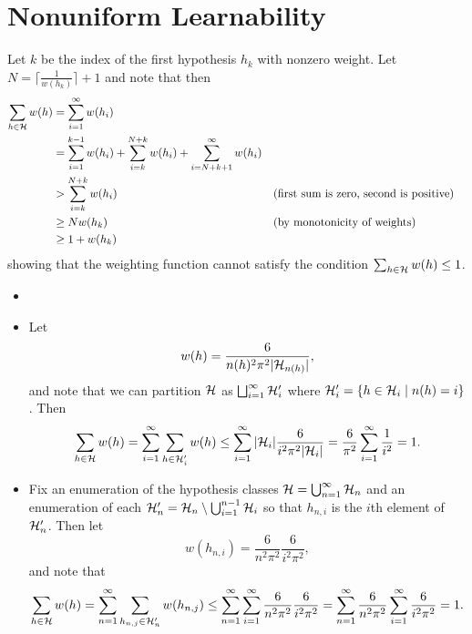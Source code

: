 \chapter{Nonuniform Learnability}

\begin{ex}
\end{ex}

\begin{ex}
  Let $k$ be the index of the first hypothesis $h_k$ with nonzero weight. Let
  $N=\lceil \frac{1}{w(h_k)} \rceil +1$ and note that then
  \begin{align*}
    \sum_{h\in\mathcal{H}} w(h)
     & =\sum_{i=1}^\infty w(h_i)                                                                             \\
     & =\sum_{i=1}^{k-1} w(h_i) +\sum_{i=k}^{N+k} w(h_i)
    +\sum_{i=N+k+1}^\infty w(h_i)                                                                            \\
     & > \sum_{i=k}^{N+k} w(h_i)                         &  & \text{(first sum is zero, second is positive)} \\
     & \geq N w(h_k)                                     &  & \text{(by monotonicity of weights)}            \\
     & \geq 1 + w(h_k)
  \end{align*}
  showing that the weighting function cannot satisfy the condition
  $\sum_{h\in\mathcal{H}}w(h)\leq 1$.
\end{ex}

\begin{ex}
  \begin{itemize}
    \item[]
    \item Let
          \[
            w(h)=\frac{6}{n(h)^2\pi^2|\mathcal{H}_{n(h)}|},
          \]
          and note that we can partition $\mathcal{H}$ as
          $\bigsqcup_{i=1}^\infty \mathcal{H}'_i$
          where $\mathcal{H}'_i=\{h\in \mathcal{H}_i \mid n(h) = i\}$. Then
          \begin{align*}
            \sum_{h\in\mathcal{H}} w(h)
            = \sum_{i=1}^\infty\sum_{h\in \mathcal{H}'_i} w(h)
            \leq \sum_{i=1}^\infty |\mathcal{H}_i| \frac{6}{i^2 \pi^2 |\mathcal{H}_i|}
            =\frac{6}{\pi^2}\sum_{i=1}^\infty \frac{1}{i^2} = 1.
          \end{align*}
    \item Fix an enumeration of the hypothesis classes
          $\mathcal{H}=\bigcup_{n=1}^\infty\mathcal{H}_n$ and an enumeration of each
          $\mathcal{H}_n'=\mathcal{H}_n\setminus \bigcup_{i=1}^{n-1}\mathcal{H}_i$ so that $h_{n,i}$ is the
          $i$th element of $\mathcal{H}_n'$. Then let
          \[
            w(h_{n,i})=\frac{6}{n^2\pi^2}\frac{6}{i^2\pi^2},
          \]
          and note that
          \begin{align*}
            \sum_{h\in\mathcal{H}} w(h)
            = \sum_{n=1}^\infty\sum_{h_{n,j}\in \mathcal{H}'_n} w(h_{n,j})
            \leq \sum_{n=1}^\infty\sum_{i=1}^\infty
            \frac{6}{n^2 \pi^2} \frac{6}{i^2 \pi^2}
            =\sum_{n=1}^\infty \frac{6}{n^2 \pi^2}
            \sum_{i=1}^\infty \frac{6}{i^2 \pi^2}
            =1.
          \end{align*}
  \end{itemize}
\end{ex}

